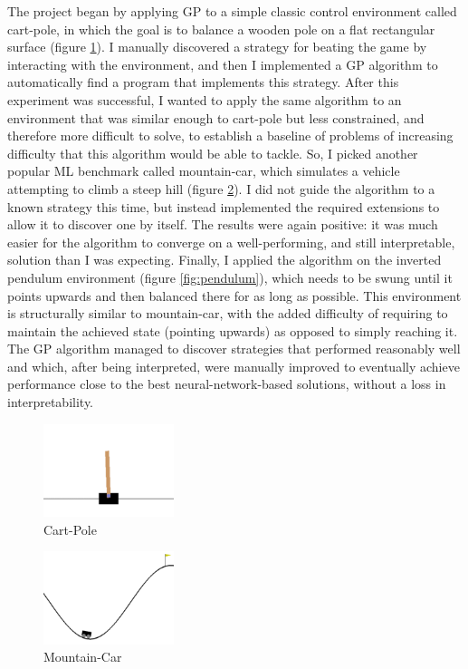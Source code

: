 The project began by applying GP to a simple classic control environment called cart-pole, in which the goal is to balance a wooden pole on a flat rectangular surface (figure \ref{fig:cart-pole}). I manually discovered a strategy for beating the game by interacting with the environment, and then I implemented a GP algorithm to automatically find a program that implements this strategy. After this experiment was successful, I wanted to apply the same algorithm to an environment that was similar enough to cart-pole but less constrained, and therefore more difficult to solve, to establish a baseline of problems of increasing difficulty that this algorithm would be able to tackle. So, I picked another popular ML benchmark called mountain-car, which simulates a vehicle attempting to climb a steep hill (figure \ref{fig:mountain-car}). I did not guide the algorithm to a known strategy this time, but instead implemented the required extensions to allow it to discover one by itself. The results were again positive: it was much easier for the algorithm to converge on a well-performing, and still interpretable, solution than I was expecting. Finally, I applied the algorithm on the inverted pendulum environment (figure \ref{fig:pendulum}), which needs to be swung until it points upwards and then balanced there for as long as possible. This environment is structurally similar to mountain-car, with the added difficulty of requiring to maintain the achieved state (pointing upwards) as opposed to simply reaching it. The GP algorithm managed to discover strategies that performed reasonably well and which, after being interpreted, were manually improved to eventually achieve performance close to the best neural-network-based solutions, without a loss in interpretability.

\begin{figure}[H]
    \centering
    \includegraphics[width=3.8cm]{images/cartpole}
    \caption{Cart-Pole}
    \label{fig:cart-pole}
\end{figure}

\begin{figure}[H]
    \centering
    \includegraphics[width=3.8cm]{images/mountain-car}
    \caption{Mountain-Car}
    \label{fig:mountain-car}
\end{figure}


